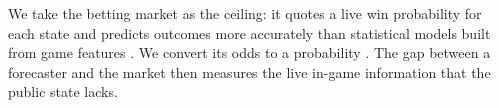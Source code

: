 We take the betting market as the ceiling: it quotes a live win probability for each state and predicts
outcomes more accurately than statistical models built from game features \citep{boulier2003,
levitt2004}. We convert its odds to a probability \citep{strumbelj2014}. The gap between a forecaster and
the market then measures the live in-game information that the public state lacks.
